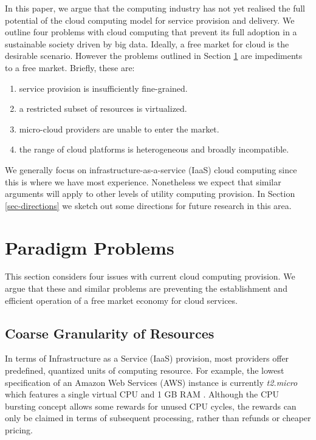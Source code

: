 \documentclass[conference,10pt]{IEEEtran}
\begin{document}
In this paper, we argue that the computing industry has not yet realised the full potential of the cloud computing model for service provision and delivery. We outline four problems with cloud computing that prevent its full adoption in a sustainable society driven by big data.
Ideally, a free market for cloud is the desirable scenario. However the problems outlined in Section \ref{sec-probs}
are impediments to a free market. Briefly, these are:
\begin{enumerate}
\item service provision is insufficiently fine-grained.
\item a restricted subset of resources is virtualized.
\item micro-cloud providers are unable to enter the market.
\item the range of cloud platforms is heterogeneous and broadly incompatible.
\end{enumerate}

We generally focus on infrastructure-as-a-service (IaaS) cloud computing since this is where we have most experience. Nonetheless we expect that similar arguments will apply to other levels of utility computing provision.
%
In Section \ref{sec-directions} we sketch out some directions for future research in this area.


\section{Paradigm Problems}
\label{sec-probs}

This section considers four issues with current cloud computing provision.
We argue that these and similar problems are preventing the establishment and efficient operation of a free market economy for cloud services.



\subsection{Coarse Granularity of Resources}

In terms of Infrastructure as a Service (IaaS) provision, most providers offer predefined, quantized units of computing resource. For example, the lowest specification of an Amazon Web Services (AWS) instance is currently \emph{t2.micro} which features a single virtual CPU and 1 GB RAM \cite{amznt2}. Although the CPU bursting concept allows some rewards for unused CPU cycles, the rewards can only be claimed in terms of subsequent processing, rather than refunds or cheaper pricing.  
\end{document}
